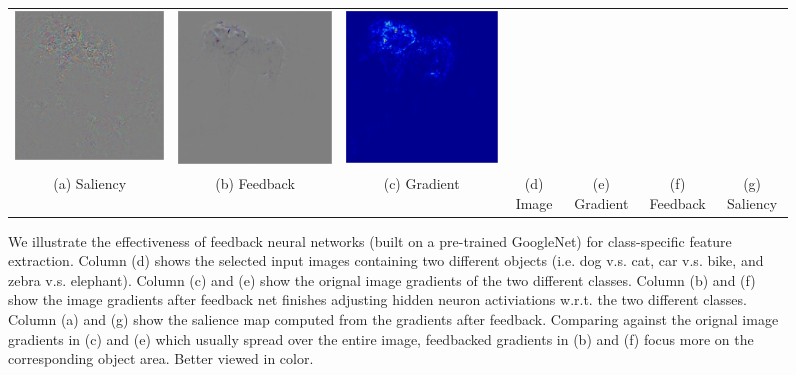 \begin{figure}
\begin{center}
\begin{tabular}{ccccccc}
\includegraphics[width=0.13\linewidth]{figs/examples/googlenet/oxford/zeb-ele2_diff_387} &
\includegraphics[width=0.13\linewidth]{figs/examples/googlenet/soft/zeb-ele2_diff_387} &
\includegraphics[width=0.13\linewidth]{figs/examples/googlenet/soft/zeb-ele2_sali_387} \\
{\small (a) Saliency} &
{\small (b) Feedback} &
{\small (c) Gradient} &
{\small (d) Image} &
{\small (e) Gradient} &
{\small (f) Feedback} &
{\small (g) Saliency}
\end{tabular}
\caption{We illustrate the effectiveness of feedback neural networks (built on a pre-trained GoogleNet) for class-specific feature extraction. Column (d) shows the selected input images containing two different objects (i.e. dog v.s. cat, car v.s. bike, and zebra v.s. elephant). Column (c) and (e) show the orignal image gradients of the two different classes. Column (b) and (f) show the image gradients after feedback net finishes adjusting hidden neuron activiations w.r.t. the two different classes. Column (a) and (g) show the salience map computed from the gradients after feedback. Comparing against the orignal image gradients in (c) and (e) which usually spread over the entire image, feedbacked gradients in (b) and (f) focus more on the corresponding object area. Better viewed in color.}
\label{fig:examples}
\end{center}
\end{figure}


